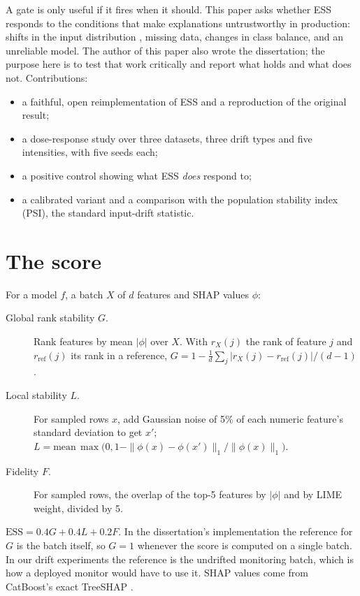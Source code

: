 \documentclass[11pt]{article}
\begin{document}
A gate is only useful if it fires when it should. This paper asks whether ESS responds to the conditions that make explanations
untrustworthy in production: shifts in the input distribution \cite{quinonero2009shift,rabanser2019failing}, missing data, changes
in class balance, and an unreliable model. The author of this paper also wrote the dissertation; the purpose here is to test that work
critically and report what holds and what does not. Contributions:
\begin{itemize}
  \item a faithful, open reimplementation of ESS and a reproduction of the original result;
  \item a dose-response study over three datasets, three drift types and five intensities, with five seeds each;
  \item a positive control showing what ESS \emph{does} respond to;
  \item a calibrated variant and a comparison with the population stability index (PSI), the standard input-drift statistic.
\end{itemize}

\section{The score}
For a model \(f\), a batch \(X\) of \(d\) features and SHAP values \(\phi\):
\begin{description}
  \item[Global rank stability \(G\).] Rank features by mean \(|\phi|\) over \(X\). With \(r_X(j)\) the rank of feature \(j\) and
    \(r_{\text{ref}}(j)\) its rank in a reference, \(G=1-\frac{1}{d}\sum_j |r_X(j)-r_{\text{ref}}(j)|/(d-1)\).
  \item[Local stability \(L\).] For sampled rows \(x\), add Gaussian noise of 5\% of each numeric feature's standard deviation to get
    \(x'\); \(L=\text{mean}\,\max\bigl(0,1-\|\phi(x)-\phi(x')\|_1/\|\phi(x)\|_1\bigr)\).
  \item[Fidelity \(F\).] For sampled rows, the overlap of the top-5 features by \(|\phi|\) and by LIME weight, divided by 5.
\end{description}
\(\text{ESS}=0.4G+0.4L+0.2F\). In the dissertation's implementation the reference for \(G\) is the batch itself, so \(G=1\) whenever
the score is computed on a single batch. In our drift experiments the reference is the undrifted monitoring batch, which is how a
deployed monitor would have to use it. SHAP values come from CatBoost's exact TreeSHAP \cite{prokhorenkova2018catboost}.
\end{document}
